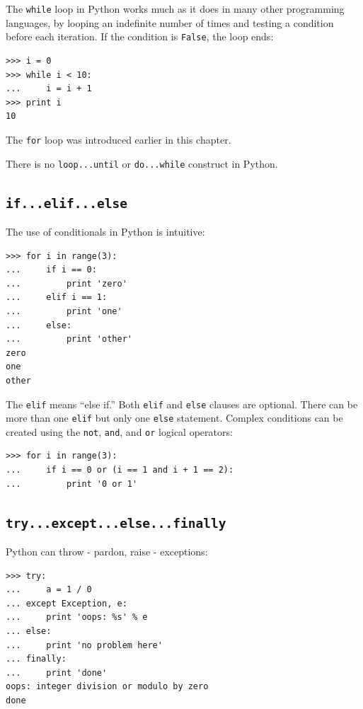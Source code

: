 \documentclass[justified,sixbynine]{tufte-book}
\def\ft{\small\tt}
\theoremstyle{plain}%
\theoremstyle{definition}
\theoremstyle{remark}
\begin{document}
\begin{fullwidth}
The {\ft while} loop in Python works much as it does in many other programming languages, by looping an indefinite number of times and testing a condition before each iteration. If the condition is {\ft False}, the loop ends:
\begin{lstlisting}
>>> i = 0
>>> while i < 10:
...     i = i + 1
>>> print i
10
\end{lstlisting}

The {\ft for} loop was introduced earlier in this chapter.

There is no {\ft loop...until} or {\ft do...while} construct in Python.

\goodbreak\subsection{{\ft if...elif...else}}

  
The use of conditionals in Python is intuitive:
\begin{lstlisting}
>>> for i in range(3):
...     if i == 0:
...         print 'zero'
...     elif i == 1:
...         print 'one'
...     else:
...         print 'other'
zero
one
other
\end{lstlisting}

The {\ft elif} means ``else if.'' Both {\ft elif} and {\ft else} clauses are optional. There can be more than one {\ft elif} but only one {\ft else} statement. Complex conditions can be created using the {\ft not}, {\ft and}, and {\ft or} logical operators:
\begin{lstlisting}
>>> for i in range(3):
...     if i == 0 or (i == 1 and i + 1 == 2):
...         print '0 or 1'
\end{lstlisting}

\goodbreak\subsection{{\ft try...except...else...finally}}

   
Python can throw - pardon, raise - exceptions:
\begin{lstlisting}
>>> try:
...     a = 1 / 0
... except Exception, e:
...     print 'oops: %s' % e
... else:
...     print 'no problem here'
... finally:
...     print 'done'
oops: integer division or modulo by zero
done
\end{lstlisting}


\end{fullwidth}
\end{document}
